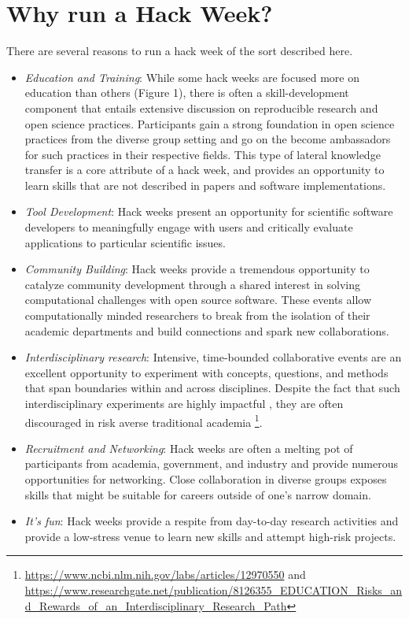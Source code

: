 \section*{Why run a Hack Week?}

There are several reasons to run a hack week of the sort described here.

\begin{itemize}
\item{\textit{Education and Training}: %
While some hack weeks are focused more on education than others (Figure 1), there is often a skill-development component that entails extensive discussion on reproducible research and open science practices. Participants gain a strong foundation in open science practices from the diverse group setting and go on the become ambassadors for such practices in their respective fields. This type of lateral knowledge transfer is a core attribute of a hack week, and provides an opportunity to learn skills that are not described in papers and software implementations.}

\item{\textit{Tool Development}: Hack weeks present an opportunity for scientific software developers to meaningfully engage with users and critically evaluate applications to particular scientific issues.}

\item{\textit{Community Building}: Hack weeks provide a tremendous opportunity to catalyze community development through a shared interest in solving computational challenges with open source software. These events allow computationally minded researchers to break from the isolation of their academic departments and build connections and spark new collaborations.}


\item{\textit{Interdisciplinary research}: Intensive, time-bounded collaborative events are an excellent opportunity to experiment with concepts, questions, and methods that span boundaries within and across disciplines. Despite the fact that such interdisciplinary experiments are highly impactful \cite{Hall2012-hi}, they are often discouraged in risk averse traditional academia \footnote{\url{https://www.ncbi.nlm.nih.gov/labs/articles/12970550} and \url{https://www.researchgate.net/publication/8126355_EDUCATION_Risks_and_Rewards_of_an_Interdisciplinary_Research_Path}}}.

\item{\textit{Recruitment and Networking}: Hack weeks are often a melting pot of participants from academia, government, and industry and provide numerous opportunities for networking. Close collaboration in diverse groups exposes skills that might be suitable for careers outside of one's narrow domain.}

\item{\textit{It's fun}: Hack weeks provide a respite from day-to-day research activities and provide a low-stress venue to learn new skills and attempt high-risk projects.}

\end{itemize}


